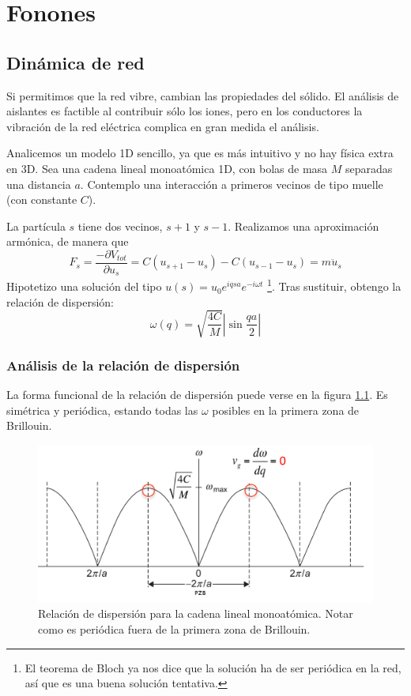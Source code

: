 \part{Fonones}

\chapter{Dinámica de red}

Si permitimos que la red vibre, cambian las propiedades del sólido. El
análisis de aislantes es factible al contribuir sólo los iones, pero
en los conductores la vibración de la red eléctrica complica en gran
medida el análisis.

Analicemos un modelo 1D sencillo, ya que es más intuitivo y no hay
física extra en 3D. Sea una cadena lineal monoatómica 1D, con bolas de
masa $M$ separadas una distancia $a$. Contemplo una interacción a
primeros vecinos de tipo muelle (con constante $C$).

La partícula $s$ tiene dos vecinos, $s+1$ y $s-1$.
Realizamos una aproximación armónica, de manera que
\begin{equation}
  F_s = \frac{-\partial V_{tot}}{\partial u_s}  = C(u_{s+1} -
  u_{s}) - C(u_{s-1} - u_s) = m \ddot u_s
\end{equation}
Hipotetizo una solución del tipo $u(s) = u_0 e^{iqsa}e^{-i\omega t}$
\footnote{El teorema de Bloch ya nos dice que la solución ha de ser
  periódica en la red, así que es una buena solución tentativa.}. Tras
sustituir, obtengo la relación de dispersión:
\begin{equation}
\omega (q) = \sqrt{\frac{4C}{M}} \left| \sin \frac{qa}{2} \right|
\end{equation}

\section{Análisis de la relación de dispersión}
La forma funcional de la relación de dispersión puede verse en la
figura \ref{fig:reldisp}. Es simétrica y periódica, estando todas las
$\omega$ posibles en la primera zona de Brillouin.

\begin{figure}
  \centering
  \includegraphics[width=\textwidth]{figures/reldisp.png}
  \caption{Relación de dispersión para la cadena lineal
    monoatómica. Notar como es periódica fuera de la primera zona de
    Brillouin.}
  \label{fig:reldisp}
\end{figure}

